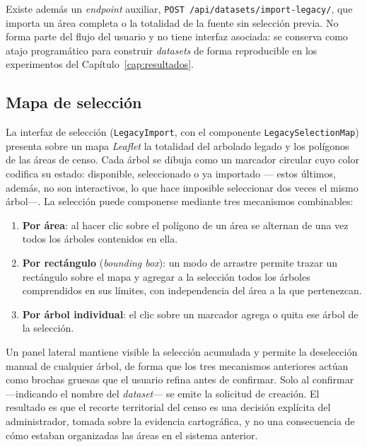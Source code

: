 Existe además un \textit{endpoint} auxiliar,
\texttt{POST /api/datasets/import-legacy/}, que importa un área completa o la
totalidad de la fuente sin selección previa. No forma parte del flujo del usuario y
no tiene interfaz asociada: se conserva como atajo programático para construir
\textit{datasets} de forma reproducible en los experimentos del
Capítulo~\ref{cap:resultados}.

\subsection{Mapa de selección}

La interfaz de selección (\texttt{LegacyImport}, con el componente
\texttt{LegacySelectionMap}) presenta sobre un mapa \textit{Leaflet} la totalidad del arbolado
legado y los polígonos de las áreas de censo. Cada árbol se dibuja como un marcador
circular cuyo color codifica su estado: disponible, seleccionado o ya importado ---
estos últimos, además, no son interactivos, lo que hace imposible seleccionar dos
veces el mismo árbol---. La selección puede componerse mediante tres mecanismos
combinables:

\renewcommand{\labelenumi}{\alph{enumi})}
\begin{enumerate}
  \item \textbf{Por área}: al hacer clic sobre el polígono de un área se alternan de
        una vez todos los árboles contenidos en ella.
  \item \textbf{Por rectángulo} (\textit{bounding box}): un modo de arrastre permite
        trazar un rectángulo sobre el mapa y agregar a la selección todos los árboles
        comprendidos en sus límites, con independencia del área a la que pertenezcan.
  \item \textbf{Por árbol individual}: el clic sobre un marcador agrega o quita ese
        árbol de la selección.
\end{enumerate}
\renewcommand{\labelenumi}{\arabic{enumi}.}

Un panel lateral mantiene visible la selección acumulada y permite la
deselección manual de cualquier árbol, de forma que los tres mecanismos
anteriores actúan como brochas gruesas que el usuario refina antes de confirmar. Solo
al confirmar ---indicando el nombre del \textit{dataset}--- se emite la solicitud de
creación. El resultado es que el recorte territorial del censo es una decisión
explícita del administrador, tomada sobre la evidencia cartográfica, y no una
consecuencia de cómo estaban organizadas las áreas en el sistema anterior.

